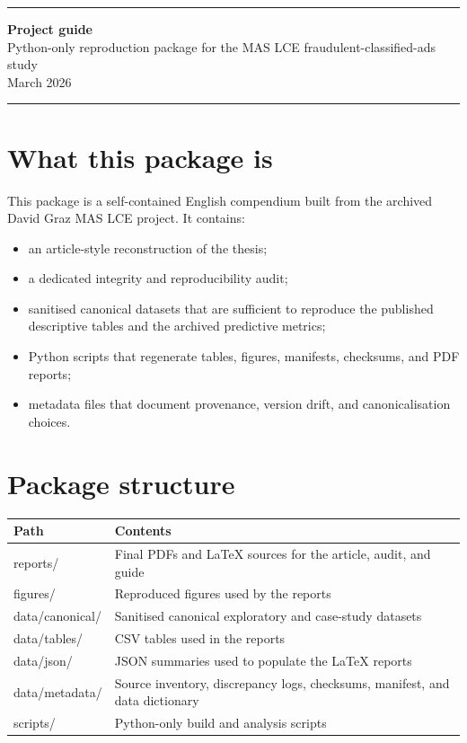\documentclass[11pt,a4paper]{article}
\begin{document}
{\color{accent}\rule{\textwidth}{1.2pt}}
\begin{center}
    {\LARGE\bfseries Project guide}\\[0.4em]
    {\large Python-only reproduction package for the MAS LCE fraudulent-classified-ads study}\\[0.8em]
    {\normalsize March 2026}
\end{center}
{\color{accent}\rule{\textwidth}{0.6pt}}

\section*{What this package is}
This package is a self-contained English compendium built from the archived David Graz MAS LCE project. It contains:
\begin{itemize}[leftmargin=1.5em]
    \item an article-style reconstruction of the thesis;
    \item a dedicated integrity and reproducibility audit;
    \item sanitised canonical datasets that are sufficient to reproduce the published descriptive tables and the archived predictive metrics;
    \item Python scripts that regenerate tables, figures, manifests, checksums, and PDF reports;
    \item metadata files that document provenance, version drift, and canonicalisation choices.
\end{itemize}

\section{Package structure}
\begin{tabularx}{\textwidth}{p{4.0cm} X}
\toprule
Path & Contents \\
\midrule
reports/ & Final PDFs and LaTeX sources for the article, audit, and guide \\
figures/ & Reproduced figures used by the reports \\
data/canonical/ & Sanitised canonical exploratory and case-study datasets \\
data/tables/ & CSV tables used in the reports \\
data/json/ & JSON summaries used to populate the LaTeX reports \\
data/metadata/ & Source inventory, discrepancy logs, checksums, manifest, and data dictionary \\
scripts/ & Python-only build and analysis scripts \\
\bottomrule
\end{tabularx}
\end{document}
